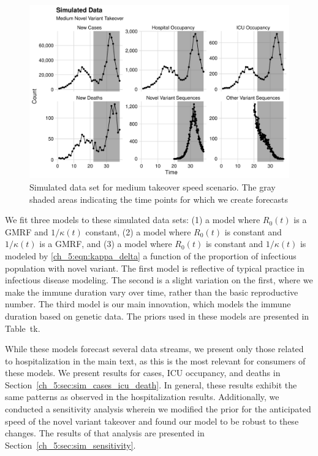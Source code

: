 \begin{figure}
    \centering
    \includegraphics[width=1.0\columnwidth]{simulated_binned_data_medium_plot}
    \caption[Simulated data set for medium takeover speed scenario.]{Simulated data set for medium takeover speed scenario.
    The gray shaded areas indicating the time points for which we create forecasts}
    \label{ch_5:fig:simulated_binned_data_medium_plot}
\end{figure}


We fit three models to these simulated data sets: (1) a model where \( R_0(t) \) is a GMRF and \( 1 / \kappa(t) \) constant, (2) a model where \( R_0(t) \) is constant and \( 1 / \kappa(t) \) is a GMRF, and (3) a model where \( R_0(t) \) is constant and \( 1 / \kappa(t) \) is modeled by \eqref{ch_5:eqn:kappa_delta} a function of the proportion of infectious population with novel variant.
The first model is reflective of typical practice in infectious disease modeling.
The second is a slight variation on the first, where we make the immune duration vary over time, rather than the basic reproductive number.
The third model is our main innovation, which models the immune duration based on genetic data.
The priors used in these models are presented in Table~tk.

While these models forecast several data streams, we present only those related to hospitalization in the main text, as this is the most relevant for consumers of these models.
We present results for cases, ICU occupancy, and deaths in Section~\ref{ch_5:sec:sim_cases_icu_death}.
In general, these results exhibit the same patterns as observed in the hospitalization results.
Additionally, we conducted a sensitivity analysis wherein we modified the prior for the anticipated speed of the novel variant takeover and found our model to be robust to these changes.
The results of that analysis are presented in Section~\ref{ch_5:sec:sim_sensitivity}.

